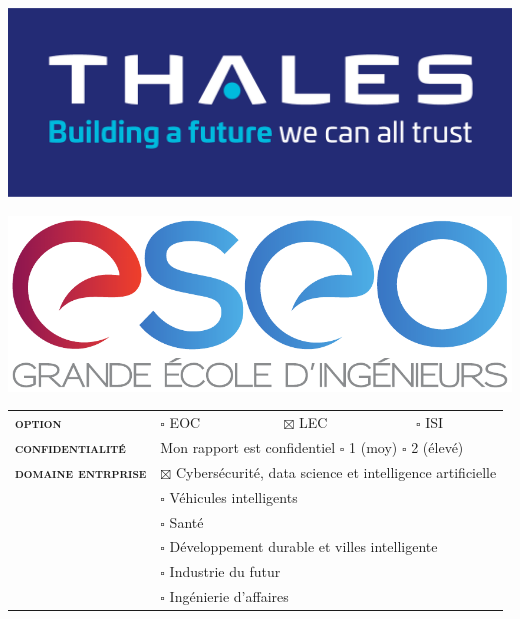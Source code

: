 \begin{titlepage}
	\enlargethispage{2cm}

	\begin{center}

		\textsc{\@title}
		\vspace*{0.5cm}

		\large{\@author}

		\vspace*{0.5cm}
		\large{\LARGE{\textbf{\Subject}}}
		
		\Dates

		\vspace*{0.5cm}
		\includegraphics[scale=0.5]{data/Thales_LOGO.png}

		\vspace*{1cm}
		\includegraphics[scale=0.75]{data/ESEO_LOGO.pdf}

	\end{center}

	\vfill

	\begin{tabular}{llll}
		\textsc{\textbf{option}} 
			& $\square$ EOC & $\boxtimes$ LEC & $\square$ ISI \\
		\textsc{\textbf{confidentialité}} 
			& \multicolumn{3}{l}{Mon rapport est confidentiel $\square$ 1 (moy) $\square$ 2 (élevé)} \\
		\textsc{\textbf{domaine entrprise}}	
			& \multicolumn{3}{l}{$\boxtimes$ Cybersécurité, data science et intelligence artificielle} \\
			& \multicolumn{3}{l}{$\square$ Véhicules intelligents} \\
			& \multicolumn{3}{l}{$\square$ Santé} \\
			& \multicolumn{3}{l}{$\square$ Développement durable et villes intelligente}\\
			& \multicolumn{3}{l}{$\square$ Industrie du futur} \\
			& \multicolumn{3}{l}{$\square$ Ingénierie d'affaires} \\		
	\end{tabular}

	\vspace*{0.75cm}

	\SupervisorSection

	\TutorSection
	\vspace{2cm}

\end{titlepage}